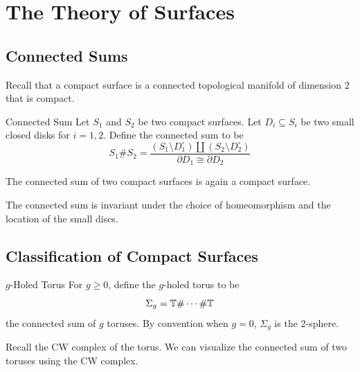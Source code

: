 \documentclass[a4paper]{article}
\begin{document}
\pagebreak
\section{The Theory of Surfaces}
\subsection{Connected Sums}
Recall that a compact surface is a connected topological manifold of dimension $2$ that is compact. 

\begin{defn}{Connected Sum}{} Let $S_1$ and $S_2$ be two compact surfaces. Let $D_i\subseteq S_i$ be two small closed disks for $i=1,2$. Define the connected sum to be $$S_1\# S_2=\frac{(S_1\setminus D_1^\circ)\amalg(S_2\setminus D_2^\circ)}{\partial D_1\cong\partial D_2}$$
\end{defn}

\begin{lmm}{}{} The connected sum of two compact surfaces is again a compact surface. 
\end{lmm}

\begin{prp}{}{} The connected sum is invariant under the choice of homeomorphism and the location of the small discs. 
\end{prp}

\subsection{Classification of Compact Surfaces}
\begin{defn}{$g$-Holed Torus}{} For $g\geq 0$, define the $g$-holed torus to be $$\Sigma_g=\mathbb{T}\#\cdots\#\mathbb{T}$$ the connected sum of $g$ toruses. By convention when $g=0$, $\Sigma_g$ is the $2$-sphere. 
\end{defn}

Recall the CW complex of the torus. We can visualize the connected sum of two toruses using the CW complex. 
\end{document}
